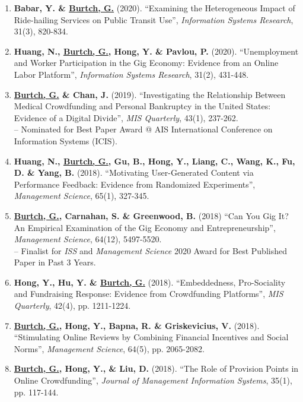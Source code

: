 \documentclass[10.5pt,letterpaper,sans]{moderncv}        %
\begin{document}
\begin{enumerate}[leftmargin=!,labelindent=5pt,itemindent=-15pt]
\item \textbf{Babar, Y. \& \underline{Burtch, G.}} (2020). ``Examining the Heterogeneous Impact of Ride-hailing Services on Public Transit Use'', \textit{Information Systems Research}, 31(3), 820-834.

\item \textbf{Huang, N., \underline{Burtch, G.}, Hong, Y. \& Pavlou, P.} (2020). ``Unemployment and Worker Participation in the Gig Economy: Evidence from an Online Labor Platform'', \textit{Information Systems Research}, 31(2), 431-448.

\item \textbf{\underline{Burtch, G.} \& Chan, J.} (2019). ``Investigating the Relationship Between Medical Crowdfunding and Personal Bankruptcy in the United States: Evidence of a Digital Divide'', \textit{MIS Quarterly}, 43(1), 237-262. \\-- Nominated for Best Paper Award @ AIS International Conference on Information Systems (ICIS).

\item \textbf{Huang, N., \underline{Burtch, G.}, Gu, B., Hong, Y., Liang, C., Wang, K., Fu, D. \& Yang, B.} (2018). ``Motivating User-Generated Content via Performance Feedback: Evidence from Randomized Experiments'', \textit{Management Science}, 65(1), 327-345.

\item \textbf{\underline{Burtch, G.}, Carnahan, S. \& Greenwood, B.} (2018) ``Can You Gig It? An Empirical Examination of the Gig Economy and Entrepreneurship'', \textit{Management Science}, 64(12), 5497-5520. \\-- Finalist for \textit{ISS} and \textit{Management Science} 2020 Award for Best Published Paper in Past 3 Years.

\item \textbf{Hong, Y., Hu, Y. \& \underline{Burtch, G.}} (2018). ``Embeddedness, Pro-Sociality and Fundraising Response: Evidence from Crowdfunding Platforms'', \textit{MIS Quarterly}, 42(4), pp. 1211-1224.

\item \textbf{\underline{Burtch, G.}, Hong, Y., Bapna, R. \& Griskevicius, V.} (2018). ``Stimulating Online Reviews by Combining Financial Incentives and Social Norms'', \textit{Management Science}, 64(5), pp. 2065-2082.

\item \textbf{\underline{Burtch, G.}, Hong, Y., \& Liu, D.} (2018). ``The Role of Provision Points in Online Crowdfunding'', \textit{Journal of Management Information Systems}, 35(1), pp. 117-144.


\end{enumerate}
\end{document}
